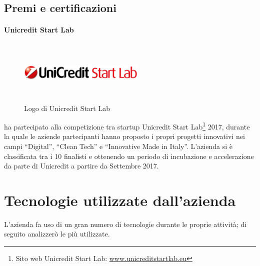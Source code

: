    \subsection{Premi e certificazioni}

   \paragraph{Unicredit Start Lab}
   \begin{figure}[H]
      \begin{center}
         \includegraphics[width=6cm,height=3cm,keepaspectratio]{immagini/unicreditstartlab-logo}
      \end{center}
      \caption{Logo di Unicredit Start Lab}\label{logounicreditstartlab}
   \end{figure}
   \nomeAzienda{} ha partecipato alla competizione tra startup Unicredit Start Lab\footnote{Sito web Unicredit Start Lab: \href{www.unicreditstartlab.eu}{www.unicreditstartlab.eu}} 2017, durante la quale le aziende partecipanti hanno proposto i propri progetti innovativi nei campi ``Digital'', ``Clean Tech'' e ``Innovative Made in Italy''. L'azienda si è classificata tra i 10 finalisti e ottenendo un periodo di incubazione e accelerazione da parte di Unicredit a partire da Settembre 2017.

\section{Tecnologie utilizzate dall'azienda}
L'azienda fa uso di un gran numero di tecnologie durante le proprie attività; di seguito analizzerò le più utilizzate.


